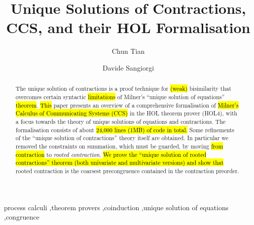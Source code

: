 \documentclass[3p,preprint]{elsarticle}
\begin{document}
\ifrebuttal
{}



\newpage
\setcounter{page}{0}
\fi

\begin{frontmatter}

\title{Unique Solutions of Contractions, CCS, and their HOL
  Formalisation}

\author[mymainaddress]{Chun Tian}%
\address[mymainaddress]{\hl{University of Trento} and Fondazione Bruno
  Kessler, Italy}

\author[mysecondaryaddress]{Davide Sangiorgi}
\address[mysecondaryaddress]{\hl{University of Bologna, Italy and INRIA, France}}

\begin{abstract}
  The unique solution of contractions is a proof technique for
  \hl{(weak)} bisimilarity that overcomes certain syntactic \hl{limitations} of
  Milner's ``unique solution of equations'' \hl{theorem}.  \hl{This} paper
  presents an overview of a comprehensive formalisation of
  \hl{Milner's Calculus of Communicating Systems (CCS)}
  in the HOL theorem prover (HOL4), with a
  focus towards the theory of unique solutions of equations and contractions.
  The formalisation consists of about \hl{24,000 lines (1MB) of code in total.}
  Some refinements of the ``unique solution of contractions'' theory itself are obtained.
  In particular we removed the constraints on summation,
  which must be guarded, by moving \hl{from contraction} to \emph{rooted
  contraction}. \hl{We prove the ``unique solution of rooted
  contractions'' theorem (both univariate and multivariate versions)
  and show that} rooted contraction is the coarsest
  precongruence contained in the contraction preorder. 
\end{abstract}

\begin{keyword}
process calculi \sep theorem provers \sep coinduction \sep unique
solution of equations \sep congruence
\end{keyword}

\end{frontmatter}

\linenumbers




















\end{document}
